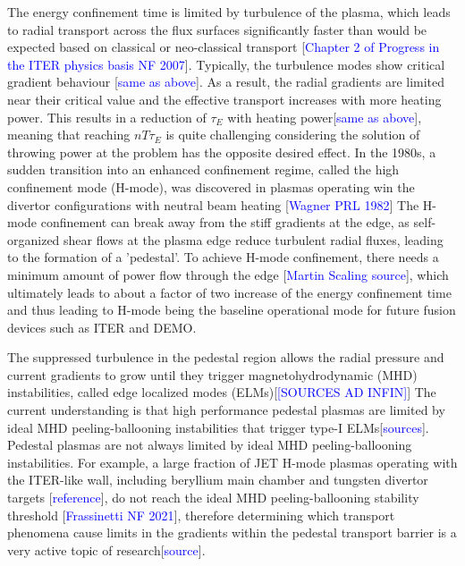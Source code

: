 \documentclass[a4paper, twoside, final, 12pt]{article}
\begin{document}
The energy confinement time is limited by turbulence of the plasma, which leads to radial transport across the flux surfaces significantly faster than would be expected based on classical or neo-classical transport [\textcolor{blue}{Chapter 2 of Progress in the ITER physics basis NF 2007}].
Typically, the turbulence modes show critical gradient behaviour [\textcolor{blue}{same as above}].
As a result, the radial gradients are limited near their critical value and the effective transport increases with more heating power.
This results in a reduction of $\tau_E$ with heating power[\textcolor{blue}{same as above}], meaning that reaching $nT\tau_E$ is quite challenging considering the solution of throwing power at the problem has the opposite desired effect.
In the 1980s, a sudden transition into an enhanced confinement regime, called the high confinement mode (H-mode), was discovered in plasmas operating win the divertor configurations with neutral beam heating [\textcolor{blue}{Wagner PRL 1982}]
The H-mode confinement can break away from the stiff gradients at the edge, as self-organized shear flows at the plasma edge reduce turbulent radial fluxes, leading to the formation of a 'pedestal'.
To achieve H-mode confinement, there needs a minimum amount of power flow through the edge [\textcolor{blue}{Martin Scaling source}], which ultimately leads to about a factor of two increase of the energy confinement time and thus leading to H-mode being the baseline operational mode for future fusion devices such as ITER and DEMO.

The suppressed turbulence in the pedestal region allows the radial pressure  and current gradients to grow until they trigger magnetohydrodynamic (MHD) instabilities, called edge localized modes (ELMs)[\textcolor{blue}{[SOURCES AD INFIN]}]
The current understanding is that high performance pedestal plasmas are limited by ideal MHD peeling-ballooning instabilities that trigger type-I ELMs[\textcolor{blue}{sources}].
Pedestal plasmas are not always limited by ideal MHD peeling-ballooning instabilities.
For example, a large fraction of JET H-mode plasmas operating with the ITER-like wall, including beryllium main chamber and tungsten divertor targets [\textcolor{blue}{reference}], do not reach the ideal MHD peeling-ballooning stability threshold [\textcolor{blue}{Frassinetti NF 2021}], therefore determining which transport phenomena cause limits in the gradients within the pedestal transport barrier is a very active topic of research[\textcolor{blue}{source}].
\end{document}
